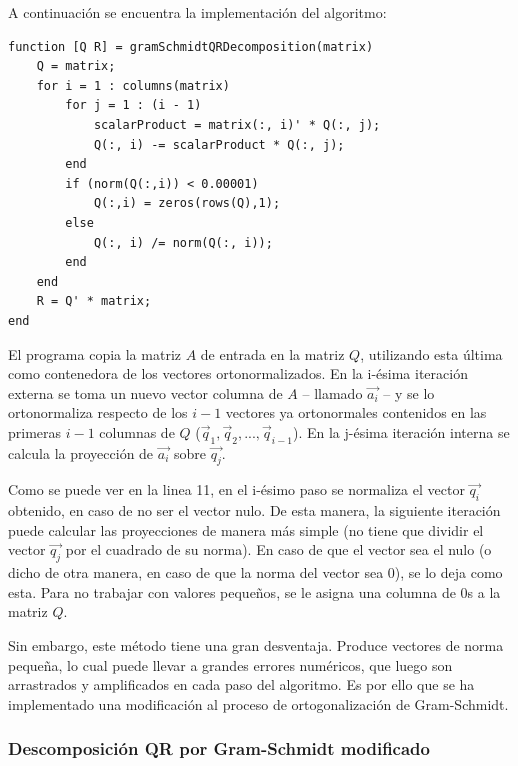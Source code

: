 \documentclass[spanish]{article}
\begin{document}
            \par A continuación se encuentra la implementación del algoritmo:
            
            \begin{lstlisting}[caption = Descomposición $QR$ por Gram-Schmidt.]
function [Q R] = gramSchmidtQRDecomposition(matrix)
	Q = matrix;
	for i = 1 : columns(matrix)
		for j = 1 : (i - 1)
			scalarProduct = matrix(:, i)' * Q(:, j);
			Q(:, i) -= scalarProduct * Q(:, j);
		end
		if (norm(Q(:,i)) < 0.00001)
			Q(:,i) = zeros(rows(Q),1);
		else
			Q(:, i) /= norm(Q(:, i));
		end
	end
	R = Q' * matrix;
end
            \end{lstlisting}
            
            \par El programa copia la matriz $A$ de entrada en la matriz $Q$, utilizando esta última como contenedora de los vectores ortonormalizados. En la i-ésima iteración externa se toma un nuevo vector columna de $A$ – llamado $\vec{a_{i}}$ – y se lo ortonormaliza respecto de los $i - 1$ vectores ya ortonormales contenidos en las primeras $i - 1$ columnas de $Q$ ($\vec{q}_{1}, \vec{q}_{2}, ... , \vec{q}_{i-1}$). En la j-ésima iteración interna se calcula la proyección de $\vec{a_{i}}$ sobre $\vec{q_{j}}$.  
            \par Como se puede ver en la linea 11, en el i-ésimo paso se normaliza el vector $\vec{q_{i}}$ obtenido, en caso de no ser el vector nulo. De esta manera, la siguiente iteración puede calcular las proyecciones de manera más simple (no tiene que dividir el vector $\vec{q_{j}}$ por el cuadrado de su norma). En caso de que el vector sea el nulo (o dicho de otra manera, en caso de que la norma del vector sea $0$), se lo deja como esta. Para no trabajar con valores pequeños, se le asigna una columna de $0$s a la matriz $Q$.
            
            \par Sin embargo, este método tiene una gran desventaja. Produce vectores de norma pequeña, lo cual puede llevar a grandes errores numéricos, que luego son arrastrados y amplificados en cada paso del algoritmo. Es por ello que se ha implementado una modificación al proceso de ortogonalización de Gram-Schmidt.

            
        \subsubsection{Descomposición QR por Gram-Schmidt modificado}
        
\end{document}
